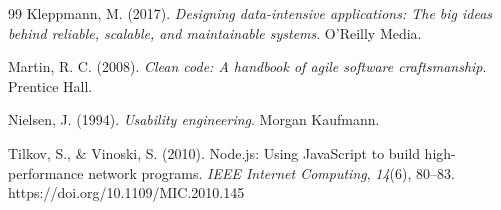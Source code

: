 \begin{thebibliography}{99}
Kleppmann, M. (2017). \textit{Designing data-intensive applications: The big ideas behind reliable, scalable, and maintainable systems}. O'Reilly Media.

Martin, R. C. (2008). \textit{Clean code: A handbook of agile software craftsmanship}. Prentice Hall.

Nielsen, J. (1994). \textit{Usability engineering}. Morgan Kaufmann.

Tilkov, S., \& Vinoski, S. (2010). Node.js: Using JavaScript to build high-performance network programs. \textit{IEEE Internet Computing}, \textit{14}(6), 80--83. https://doi.org/10.1109/MIC.2010.145


\end{thebibliography}

